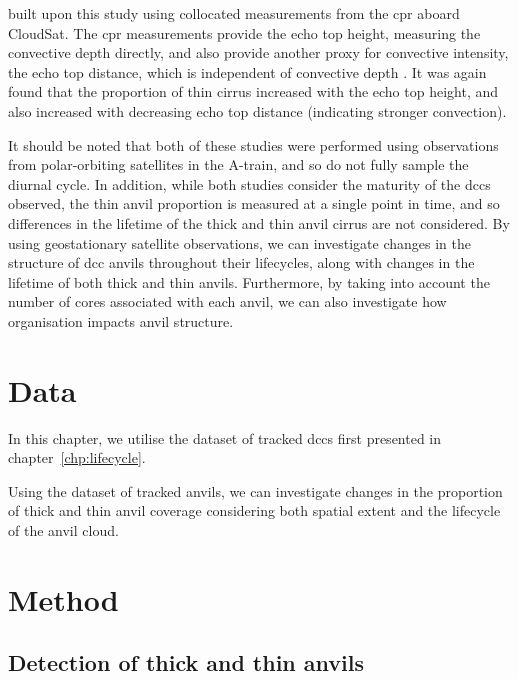 \citet{takahashi_relationships_2017} built upon this study using collocated measurements from the \acrfull{cpr} aboard CloudSat.
The \acrshort{cpr} measurements provide the echo top height, measuring the convective depth directly, and also provide another proxy for convective intensity, the echo top distance, which is independent of convective depth \citep{takahashi_characterizing_2014}.
It was again found that the proportion of thin cirrus increased with the echo top height, and also increased with decreasing echo top distance (indicating stronger convection).

It should be noted that both of these studies were performed using observations from polar-orbiting satellites in the A-train, and so do not fully sample the diurnal cycle.
In addition, while both studies consider the maturity of the \acrshort{dcc}s observed, the thin anvil proportion is measured at a single point in time, and so differences in the lifetime of the thick and thin anvil cirrus are not considered.
By using geostationary satellite observations, we can investigate changes in the structure of \acrshort{dcc} anvils throughout their lifecycles, along with changes in the lifetime of both thick and thin anvils.
Furthermore, by taking into account the number of cores associated with each anvil, we can also investigate how organisation impacts anvil structure.


\section{Data}

In this chapter, we utilise the dataset of tracked \acrshort{dcc}s first presented in chapter~\ref{chp:lifecycle}.



Using the dataset of tracked anvils, we can investigate changes in the proportion of thick and thin anvil coverage considering both spatial extent and the lifecycle of the anvil cloud.


\section{Method}

\subsection{Detection of thick and thin anvils}


